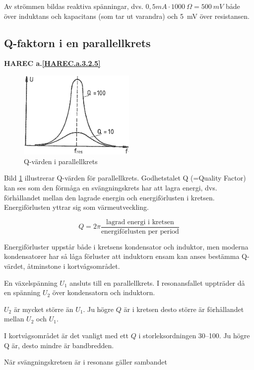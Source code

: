 Av strömmen bildas reaktiva spänningar, dvs.
\(0,5 mA \cdot 1000\ \Omega = 500\ mV\) både över induktans och kapacitans
(som tar ut varandra) och 5~mV över resistansen.

\subsection{Q-faktorn i en parallellkrets}
\textbf{HAREC a.\ref{HAREC.a.3.2.5}\label{myHAREC.a.3.2.5}}
\label{Q-faktor}

\begin{figure}
\includegraphics[width=0.5\textwidth]{images/cropped_pdfs/bild_2_3-20.pdf}
\caption{Q-värden i parallellkrets}
\label{fig:BildII3-20}
\end{figure}

Bild \ref{fig:BildII3-20} illustrerar Q-värden för parallellkrets.
Godhetstalet Q (=Quality Factor) kan ses som den förmåga en svängningskrets har
att lagra energi, dvs. förhållandet mellan den lagrade energin och
energiförlusten i kretsen.
Energiförlusten yttrar sig som värmeutveckling.

\[
Q = 2\pi \frac{\text{lagrad energi i kretsen}}{\text{energiförlusten per period}}
\]

Energiförluster uppstår både i kretsens kondensator och induktor, men moderna
kondensatorer har så låga förluster att induktorn ensam kan anses bestämma
Q-värdet, åtminstone i kortvågsområdet.

En växelspänning \(U_1\) ansluts till en parallellkrets.
I resonansfallet uppträder då en spänning \(U_2\) över kondensatorn och
induktorn.

\(U_2\) är mycket större än \(U_1\).
Ju högre \(Q\) är i kretsen desto större är förhållandet mellan \(U_2\) och
\(U_1\).

I kortvågsområdet är det vanligt med ett \(Q\) i storleksordningen 30--100.
Ju högre Q är, desto mindre är bandbredden.

När svängningskretsen är i resonans gäller sambandet

